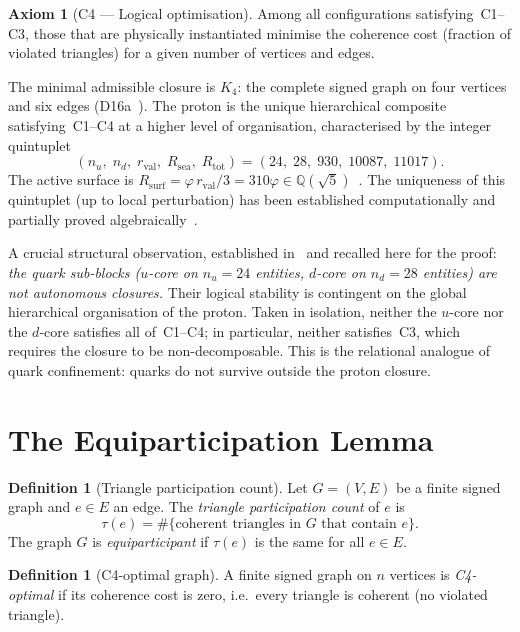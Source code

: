 \documentclass[11pt,a4paper]{article}
\theoremstyle{plain}
\theoremstyle{definition}
\newtheorem{definition}[theorem]{Definition}
\newtheorem{axiom}[theorem]{Axiom}
\theoremstyle{remark}
\newcommand{\Kfour}{K_4}
\newcommand{\Rtot}{R_{\mathrm{tot}}}
\newcommand{\Rsurf}{R_{\mathrm{surf}}}
\newcommand{\Rsea}{R_{\mathrm{sea}}}
\newcommand{\rval}{r_{\mathrm{val}}}
\newcommand{\vp}{\varphi}
\begin{document}
\begin{axiom}[C4 --- Logical optimisation]
Among all configurations satisfying~C1--C3, those that are physically instantiated minimise the coherence cost (fraction of violated triangles) for a given number of vertices and edges.
\end{axiom}

The minimal admissible closure is $\Kfour$: the complete signed graph on four vertices and six edges (D16a~\cite{PDL_D16a_2026}). The proton is the unique hierarchical composite satisfying~C1--C4 at a higher level of organisation, characterised by the integer quintuplet
\begin{equation}
(n_u,\; n_d,\; \rval,\; \Rsea,\; \Rtot) = (24,\; 28,\; 930,\; 10087,\; 11017).
\label{eq:quintuplet}
\end{equation}
The active surface is $\Rsurf = \vp\,\rval/3 = 310\vp \in \mathbb{Q}(\sqrt{5})$~\cite{PDL_D05_2026}. The uniqueness of this quintuplet (up to local perturbation) has been established computationally and partially proved algebraically~\cite{PDL_D16b_2026,PDL_D29_2026}.

A crucial structural observation, established in~\cite{PDL_Main_2026} and recalled here for the proof: \emph{the quark sub-blocks ($u$-core on $n_u = 24$ entities, $d$-core on $n_d = 28$ entities) are not autonomous closures.} Their logical stability is contingent on the global hierarchical organisation of the proton. Taken in isolation, neither the $u$-core nor the $d$-core satisfies all of~C1--C4; in particular, neither satisfies~C3, which requires the closure to be non-decomposable. This is the relational analogue of quark confinement: quarks do not survive outside the proton closure.

\section{The Equiparticipation Lemma}
\label{sec:lemma1}

\begin{definition}[Triangle participation count]
Let $G = (V, E)$ be a finite signed graph and $e \in E$ an edge. The \emph{triangle participation count} of $e$ is
\[
\tau(e) = \#\{\text{coherent triangles in } G \text{ that contain } e\}.
\]
The graph $G$ is \emph{equiparticipant} if $\tau(e)$ is the same for all $e \in E$.
\end{definition}

\begin{definition}[C4-optimal graph]
A finite signed graph on $n$ vertices is \emph{C4-optimal} if its coherence cost is zero, i.e.\ every triangle is coherent (no violated triangle).
\end{definition}
\end{document}
